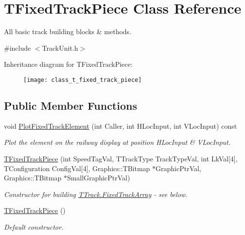 \hypertarget{class_t_fixed_track_piece}{}\section{T\+Fixed\+Track\+Piece Class Reference}
\label{class_t_fixed_track_piece}


All basic track building blocks \& methods.  




{\ttfamily \#include $<$Track\+Unit.\+h$>$}

Inheritance diagram for T\+Fixed\+Track\+Piece\+:\begin{figure}[H]
\begin{center}
\leavevmode
\texttt{[image: class\_t\_fixed\_track\_piece]}
\end{center}
\end{figure}
\subsection*{Public Member Functions}
\begin{DoxyCompactItemize}
\item 
\mbox{\label{class_t_fixed_track_piece_a13eca615770d45f35bb808eaa264fda9}} 
void \mbox{\hyperlink{class_t_fixed_track_piece_a13eca615770d45f35bb808eaa264fda9}{Plot\+Fixed\+Track\+Element}} (int Caller, int H\+Loc\+Input, int V\+Loc\+Input) const
\begin{DoxyCompactList}\small\item\em Plot the element on the railway display at position H\+Loc\+Input \& V\+Loc\+Input. \end{DoxyCompactList}\item 
\mbox{\label{class_t_fixed_track_piece_af9d54643faf473becbc953a11eacab51}} 
\mbox{\hyperlink{class_t_fixed_track_piece_af9d54643faf473becbc953a11eacab51}{T\+Fixed\+Track\+Piece}} (int Speed\+Tag\+Val, T\+Track\+Type Track\+Type\+Val, int Lk\+Val\mbox{[}4\mbox{]}, T\+Configuration Config\+Val\mbox{[}4\mbox{]}, Graphics\+::\+T\+Bitmap $\ast$Graphic\+Ptr\+Val, Graphics\+::\+T\+Bitmap $\ast$Small\+Graphic\+Ptr\+Val)
\begin{DoxyCompactList}\small\item\em Constructor for building \mbox{\hyperlink{class_t_track_aa518e921b7809730b4b43e96f7136817}{T\+Track.\+Fixed\+Track\+Array}} -\/ see below. \end{DoxyCompactList}\item 
\mbox{\label{class_t_fixed_track_piece_a5b7733fb7da20c74bd811743d70cd535}} 
\mbox{\hyperlink{class_t_fixed_track_piece_a5b7733fb7da20c74bd811743d70cd535}{T\+Fixed\+Track\+Piece}} ()
\begin{DoxyCompactList}\small\item\em Default constructor. \end{DoxyCompactList}\end{DoxyCompactItemize}
